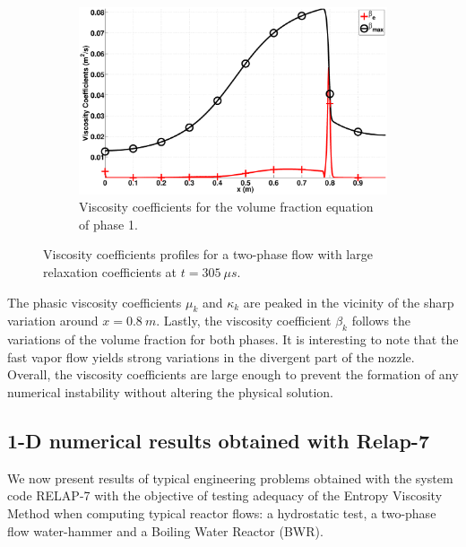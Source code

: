 \documentclass[preprint,10pt]{elsarticle}
\begin{document}
\begin{figure}[H]
        \begin{subfigure}[b]{0.495\textwidth}
                \centering
                \includegraphics[width=\textwidth]{figures/nozzle-aint-1e4_liquid_beta.eps}
                \caption{Viscosity coefficients for the volume fraction equation of phase 1.}
                \label{fig:nozzle-aint-1e4-beta}
        \end{subfigure}        
        \caption{Viscosity coefficients profiles for a two-phase flow with large relaxation coefficients at $t=305 \ \mu s$.}\label{fig:nozzle-aint-1e4-visc-coeff}
\end{figure}
%
The phasic viscosity coefficients $\mu_k$ and $\kappa_k$ are peaked in the vicinity of the sharp variation around $x=0.8 \ m$. Lastly, the viscosity coefficient $\beta_k$ follows the variations of the volume fraction for both phases. It is interesting to note that the fast vapor flow yields strong variations in the divergent part of the nozzle. Overall, the viscosity coefficients are large enough to prevent the formation of any numerical instability without altering the physical solution.
%
\subsection{1-D numerical results obtained with Relap-7}\label{sec:1d-results-relap-7}
%
We now present results of typical engineering problems obtained with the system code RELAP-7 \cite{Berry_2014} with the objective of testing adequacy of the Entropy Viscosity Method when computing typical reactor flows: a hydrostatic test, a two-phase flow water-hammer and a Boiling Water Reactor (BWR). 
%
\end{document}

